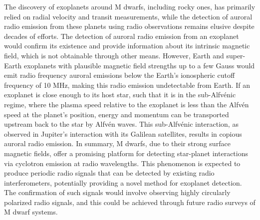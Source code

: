 \documentclass{article}
\begin{document}
The discovery of exoplanets around M dwarfs, including rocky ones, has primarily relied on radial velocity and transit measurements, while the detection of auroral radio emission from these planets using radio observations remains elusive despite decades of efforts. The detection of auroral radio emission from an exoplanet would confirm its existence and provide information about its intrinsic magnetic field, which is not obtainable through other means. However, Earth and super-Earth exoplanets with plausible magnetic field strengths up to a few Gauss would emit radio frequency auroral emissions below the Earth's ionospheric cutoff frequency of 10 MHz, making this radio emission undetectable from Earth. If an exoplanet is close enough to its host star, such that it is in the sub-Alfvénic regime, where the plasma speed relative to the exoplanet is less than the Alfvén speed at the planet's position, energy and momentum can be transported upstream back to the star by Alfvén waves. This sub-Alfvénic interaction, as observed in Jupiter's interaction with its Galilean satellites, results in copious auroral radio emission. In summary, M dwarfs, due to their strong surface magnetic fields, offer a promising platform for detecting star-planet interactions via cyclotron emission at radio wavelengths. This phenomenon is expected to produce periodic radio signals that can be detected by existing radio interferometers, potentially providing a novel method for exoplanet detection. The confirmation of such signals would involve observing highly circularly polarized radio signals, and this could be achieved through future radio surveys of M dwarf systems.
\end{document}
